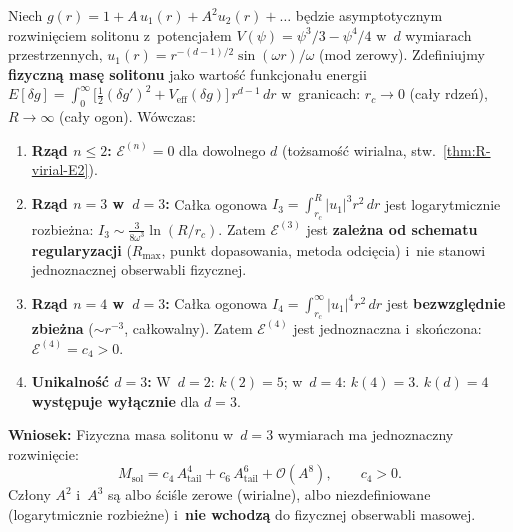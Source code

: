 
\begin{theorem}[Jednoznaczno\'s\'c $k = 4$
  jako wyk\l{}adnika masowego w~$d = 3$]%
\label{thm:R-k4-definite}
Niech $g(r) = 1 + A\,u_1(r) + A^2 u_2(r) + \ldots$ b\k{e}dzie
asymptotycznym rozwini\k{e}ciem solitonu z~potencja\l{}em
$V(\psi) = \psi^3/3 - \psi^4/4$ w~$d$ wymiarach przestrzennych,
$u_1(r) = r^{-(d-1)/2}\sin(\omega r)/\omega$ (mod zerowy).
Zdefiniujmy \textbf{fizyczn\k{a} mas\k{e} solitonu}
jako warto\'s\'c funkcjona\l{}u energii
$E[\delta g] = \int_0^\infty \bigl[\tfrac{1}{2}(\delta g')^2
  + V_{\mathrm{eff}}(\delta g)\bigr]\,r^{d-1}\,dr$
w~granicach: $r_c \to 0$ (ca\l{}y rdze\'n), $R \to \infty$
(ca\l{}y ogon). W\'owczas:
\begin{enumerate}[nosep]
  \item \textbf{Rz\k{a}d $n \le 2$:}
    $\mathcal{E}^{(n)} = 0$ dla dowolnego $d$
    (to\.zsamo\'s\'c wirialna, stw.~\ref{thm:R-virial-E2}).

  \item \textbf{Rz\k{a}d $n = 3$ w~$d = 3$:}
    Ca\l{}ka ogonowa $I_3 = \int_{r_c}^R |u_1|^3 r^2\,dr$
    jest logarytmicznie rozbie\.zna:
    $I_3 \sim \tfrac{3}{8\omega^3}\ln(R/r_c)$.
    Zatem $\mathcal{E}^{(3)}$ jest
    \textbf{zale\.zna od schematu regularyzacji}
    ($R_{\max}$, punkt dopasowania, metoda odci\k{e}cia)
    i~nie stanowi jednoznacznej obserwabli fizycznej.

  \item \textbf{Rz\k{a}d $n = 4$ w~$d = 3$:}
    Ca\l{}ka ogonowa $I_4 = \int_{r_c}^\infty |u_1|^4 r^2\,dr$
    jest \textbf{bezwzgl\k{e}dnie zbie\.zna}
    ($\sim r^{-3}$, ca\l{}kowalny).
    Zatem $\mathcal{E}^{(4)}$ jest jednoznaczna
    i~sko\'nczona: $\mathcal{E}^{(4)} = c_4 > 0$.

  \item \textbf{Unikalno\'s\'c $d = 3$:}
    W~$d = 2$: $k(2) = 5$;
    w~$d = 4$: $k(4) = 3$.
    $k(d) = 4$ \textbf{wyst\k{e}puje wy\l{}\k{a}cznie} dla $d = 3$.
\end{enumerate}

\noindent\textbf{Wniosek:}
Fizyczna masa solitonu w~$d = 3$ wymiarach ma jednoznaczny
rozwini\k{e}cie:
\begin{equation}\label{eq:R-mass-definite}
  \boxed{M_{\mathrm{sol}} = c_4\,A_{\mathrm{tail}}^4
  + c_6\,A_{\mathrm{tail}}^6 + \mathcal{O}(A^8),
  \qquad c_4 > 0.}
\end{equation}
Cz\l{}ony $A^2$ i~$A^3$ s\k{a} albo \'sci\'sle zerowe (wirialne),
albo niezdefiniowane (logarytmicznie rozbie\.zne)
i~\textbf{nie wchodz\k{a}} do fizycznej obserwabli masowej.
\end{theorem}

